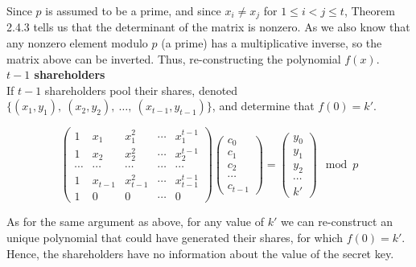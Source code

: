 Since $p$ is assumed to be a prime, and since $x_i \not= x_j$ for $1 \le i
< j \le t$, Theorem 2.4.3 tells us that the determinant of the matrix
is nonzero. As we also know that any nonzero element modulo $p$ (a
prime) has a multiplicative inverse, so the matrix above can be
inverted. Thus, re-constructing the polynomial $f(x)$.
\\

\textbf{$t-1$ shareholders} \\
If $t-1$ shareholders pool their shares, denoted $\{(x_1,y_1),\
(x_2,y_2),\ \ldots,\ (x_{t-1},y_{t-1})\}$, and determine that $f(0) = k'$.

\begin{equation}
  \begin{pmatrix}
    1      & x_1    & x_1^2    & \cdots & x_1^{t-1} \\
    1      & x_2    & x_2^2    & \cdots & x_2^{t-1} \\
    \cdots & \cdots & \cdots  & \cdots & \cdots \\
    1      & x_{t-1} & x_{t-1}^2 & \cdots & x_{t-1}^{t-1} \\
    1      & 0      & 0       & \cdots & 0
  \end{pmatrix}
  \begin{pmatrix}
    c_0 \\
    c_1 \\
    c_2 \\
    \cdots \\
    c_{t-1}
  \end{pmatrix} =
  \begin{pmatrix}
    y_0 \\
    y_1 \\
    y_2 \\
    \cdots \\
    k'
  \end{pmatrix} \mod p
\end{equation}

As for the same argument as above, for any value of $k'$ we can
re-construct an unique polynomial that could have generated their
shares, for which $f(0) = k'$. Hence, the shareholders have no
information about the value of the secret key.
